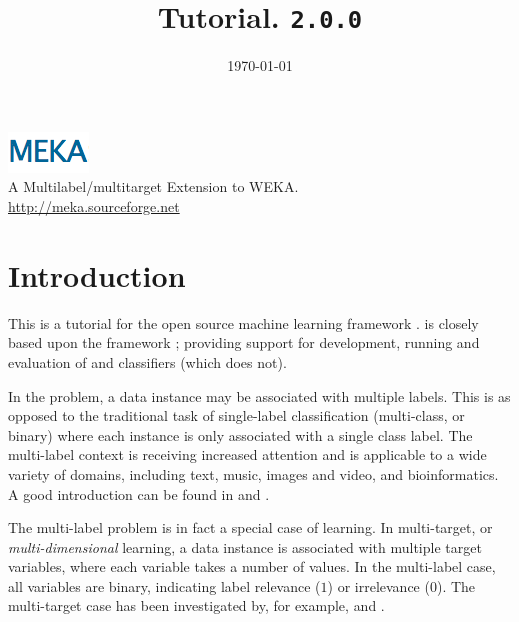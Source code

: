 \documentclass[11pt]{article}
\newcommand{\MEKA}{Meka}
\newcommand{\WEKA}{Weka}
\def\version{{\tt 2.0.0}}
\begin{document}
\title{Tutorial. \framework{\MEKA} \version }


\date{\mydate\today}

\maketitle

\begin{center}
	\includegraphics{MEKA.png}\\
		A Multilabel/multitarget Extension to WEKA.\\
		\url{http://meka.sourceforge.net}
\end{center}

\tableofcontents

\thispagestyle{empty}
\pagebreak

\section{Introduction}

This is a tutorial for the open source machine learning framework \framework{\MEKA}. \framework{\MEKA} is closely based upon the \framework{\WEKA} framework \cite{WEKA}; providing support for development, running and evaluation of  and  classifiers (which  does not).

In the  problem, a data instance may be associated with multiple labels. This is as opposed to the traditional task of single-label classification (\ie multi-class, or binary) where each instance is only associated with a single class label. The multi-label context is receiving increased attention and is applicable to a wide variety of domains, including text, music, images and video, and bioinformatics. A good introduction can be found in \cite{MMD} and \cite{Thesis}.

The multi-label problem is in fact a special case of  learning. In multi-target, or \textit{multi-dimensional} learning, a data instance is associated with multiple target variables, where each variable takes a number of values. In the multi-label case, all variables are binary, indicating label relevance ($1$) or irrelevance ($0$). The multi-target case has been investigated by, for example, \cite{UPM} and \cite{MT}.  
\end{document}
